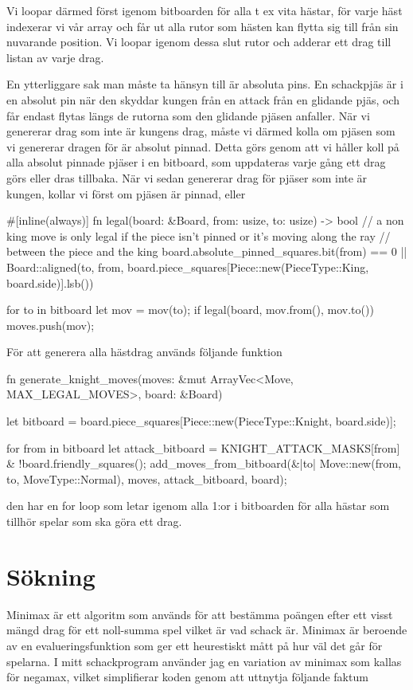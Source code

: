 \documentclass{article}
\begin{document}
Vi loopar därmed först igenom bitboarden för alla t ex vita hästar, för varje häst indexerar vi vår array och får ut alla rutor som hästen kan flytta sig till från sin nuvarande position. Vi loopar igenom dessa slut rutor och adderar ett drag till listan av varje drag. 

En ytterliggare sak man måste ta hänsyn till är absoluta pins. En schackpjäs är i en absolut pin när den skyddar kungen från en attack från en glidande pjäs, och får endast flytas längs de rutorna som den glidande pjäsen anfaller. När vi genererar drag som inte är kungens drag, måste vi därmed kolla om pjäsen som vi genererar dragen för är absolut pinnad. Detta görs genom att vi håller koll på alla absolut pinnade pjäser i en bitboard, som uppdateras varje gång ett drag görs eller dras tillbaka. När vi sedan genererar drag för pjäser som inte är kungen, kollar vi först om pjäsen är pinnad, eller 

#[inline(always)]
fn legal(board: &Board, from: usize, to: usize) -> bool {
    // a non king move is only legal if the piece isn't pinned or it's moving along the ray
    // between the piece and the king
    board.absolute_pinned_squares.bit(from) == 0 || Board::aligned(to, from, board.piece_squares[Piece::new(PieceType::King, board.side)].lsb())
}


    for to in bitboard {
        let mov = mov(to);
        if legal(board, mov.from(), mov.to()) {
            moves.push(mov);
        }
      }

      För att generera alla hästdrag används följande funktion

fn generate_knight_moves(moves: &mut ArrayVec<Move, MAX_LEGAL_MOVES>, board: &Board) {
    let bitboard = board.piece_squares[Piece::new(PieceType::Knight, board.side)];

    for from in bitboard {
        let attack_bitboard = KNIGHT_ATTACK_MASKS[from] & !board.friendly_squares();
        add_moves_from_bitboard(&|to| Move::new(from, to, MoveType::Normal), moves, attack_bitboard, board);
    }
  }

  den har en for loop som letar igenom alla 1:or i bitboarden för alla hästar som tillhör spelar som ska göra ett drag.





\section{Sökning}
Minimax är ett algoritm som används för att bestämma poängen efter ett visst mängd drag för ett noll-summa spel vilket är vad schack är. Minimax är beroende av en evalueringsfunktion som ger ett heurestiskt mått på hur väl det går för spelarna. I mitt schackprogram använder jag en variation av minimax som kallas för negamax, vilket simplifierar koden genom att uttnytja följande faktum
\end{document}
